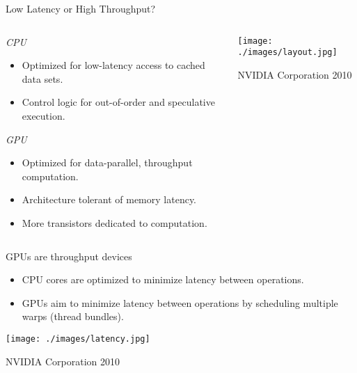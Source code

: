 \documentclass[aspectratio=43]{beamer}
\begin{document}
\begin{frame}[fragile]{Low Latency or High Throughput?}
    \begin{columns}[T]
        \begin{column}{0.6\textwidth}
            \emph{CPU}
            \begin{itemize}
                \item   Optimized for low-latency access to cached data sets.
                \item   Control logic for out-of-order and speculative execution.
            \end{itemize}

            \vspace{0.75cm}

            \emph{GPU}
            \begin{itemize}
                \item   Optimized for data-parallel, throughput computation.
                \item   Architecture tolerant of memory latency.
                \item   More transistors dedicated to computation.
            \end{itemize}
        \end{column}

        \begin{column}{0.4\textwidth}
            \vspace{-0.2cm}
            \texttt{[image: ./images/layout.jpg]}

            \footnotesize \textcopyright NVIDIA Corporation 2010
        \end{column}
    \end{columns}
\end{frame}

\begin{frame}[fragile]{GPUs are throughput devices}
    \begin{itemize}
        \item CPU cores are optimized to minimize latency between operations.
        \item GPUs aim to minimize latency between operations by scheduling multiple warps (thread bundles).
    \end{itemize}
    \begin{center}
        \texttt{[image: ./images/latency.jpg]}
    \end{center}
    \footnotesize \textcopyright NVIDIA Corporation 2010
\end{frame}
\end{document}
